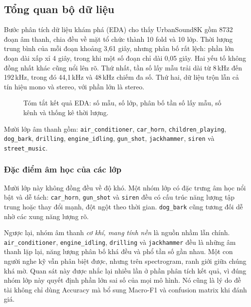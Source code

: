 \subsection{Tổng quan bộ dữ liệu}

Bước phân tích dữ liệu khám phá (EDA) cho thấy UrbanSound8K gồm 8732 đoạn âm
thanh, chia đều về mặt tổ chức thành 10 fold và 10 lớp. Thời lượng trung bình của
mỗi đoạn khoảng 3{,}61 giây, nhưng phân bố rất lệch: phần lớn đoạn dài xấp xỉ 4
giây, trong khi một số đoạn chỉ dài 0{,}05 giây. Hai yếu tố không đồng nhất khác
cũng nổi lên rõ. Thứ nhất, tần số lấy mẫu trải dài từ 8\,kHz đến 192\,kHz, trong
đó 44{,}1\,kHz và 48\,kHz chiếm đa số. Thứ hai, dữ liệu trộn lẫn cả tín hiệu mono
và stereo, với phần lớn là stereo.

\begin{figure}[H]
  \centering
  \caption{Tóm tắt kết quả EDA: số mẫu, số lớp, phân bố tần số lấy mẫu, số kênh
           và thống kê thời lượng.}
  \label{fig:eda}
\end{figure}

Mười lớp âm thanh gồm: \texttt{air\_conditioner}, \texttt{car\_horn},
\texttt{children\_playing}, \texttt{dog\_bark}, \texttt{drilling},
\texttt{engine\_idling}, \texttt{gun\_shot}, \texttt{jackhammer}, \texttt{siren}
và \texttt{street\_music}.

\subsubsection{Đặc điểm âm học của các lớp}

Mười lớp này không đồng đều về độ khó. Một nhóm lớp có đặc trưng âm học nổi bật
và dễ tách: \texttt{car\_horn}, \texttt{gun\_shot} và \texttt{siren} đều có cấu
trúc năng lượng tập trung hoặc thay đổi mạnh, đột ngột theo thời gian.
\texttt{dog\_bark} cũng tương đối dễ nhờ các xung năng lượng rõ.

Ngược lại, nhóm âm thanh \textit{cơ khí, mang tính nền} là nguồn nhầm lẫn chính.
\texttt{air\_conditioner}, \texttt{engine\_idling}, \texttt{drilling} và
\texttt{jackhammer} đều là những âm thanh lặp lại, năng lượng phân bố khá đều và
phổ tần số gần nhau. Một con người nghe kỹ vẫn phân biệt được, nhưng trên
spectrogram, ranh giới giữa chúng khá mờ. Quan sát này được nhắc lại nhiều lần ở
phần phân tích kết quả, vì đúng nhóm lớp này quyết định phần lớn sai số của mọi
mô hình. Nó cũng là lý do đề tài không chỉ dùng Accuracy mà bổ sung Macro-F1 và
confusion matrix khi đánh giá.

